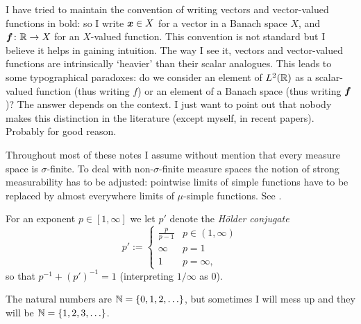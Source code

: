 I have tried to maintain the convention of writing vectors and vector-valued functions in bold: so I write $\bm{x} \in X$ for a vector in a Banach space $X$, and $\bm{f} \colon \mathbb{R} \rightarrow X$ for an $X$-valued function.
This convention is not standard but I believe it helps in gaining intuition.
The way I see it, vectors and vector-valued functions are intrinsically `heavier' than their scalar analogues.
This leads to some typographical paradoxes: do we consider an element of $L^2(\mathbb{R})$ as a scalar-valued function (thus writing $f$) or an element of a Banach space (thus writing $\bm{f}$)?
The answer depends on the context.
I just want to point out that nobody makes this distinction in the literature (except myself, in recent papers).
Probably for good reason.

Throughout most of these notes I assume without mention that every measure space is $\sigma$-finite.
To deal with non-$\sigma$-finite measure spaces the notion of strong measurability has to be adjusted: pointwise limits of simple functions have to be replaced by almost everywhere limits of $\mu$-simple functions.
See \cite[Section 1.1.b]{HNVW16}.


For an exponent $p \in [1,\infty]$ we let $p'$ denote the \emph{H\"older conjugate}
\begin{equation*}
  p' := \begin{cases}
    \frac{p}{p-1} & p \in (1,\infty) \\
    \infty & p = 1 \\
    1 & p = \infty,
  \end{cases}
\end{equation*}
so that $p^{-1} + (p')^{-1} = 1$ (interpreting $1/\infty$ as $0$).

The natural numbers are $\mathbb{N} = \{0,1,2,\ldots\}$, but sometimes I will mess up and they will be $\mathbb{N} = \{1,2,3,\ldots\}$.





